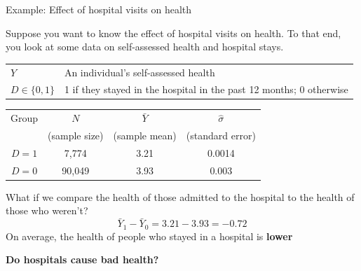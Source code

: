 \documentclass[handout, 8pt]{beamer}
\begin{document}
\begin{frame}{Example: Effect of hospital visits on health}

Suppose you want to know the effect of hospital visits on health. To that end, you look at some data on self-assessed health and hospital stays.
\pause
\begin{table}
\begin{tabular}{ll}
$Y$ & An individual's self-assessed health \\
$D \in \{0, 1\}$ & 1 if they stayed in the hospital in the past 12 months; 0 otherwise
\end{tabular}
\end{table}

\begin{table}
\begin{tabular}{cccc}
Group &$N$  &$\bar{Y}$  &$\hat{\sigma}$  \\
&(sample size) &(sample mean) &(standard error) \\
\hline
$D=1$ &7,774 &3.21 &0.0014 \\
$D=0$ &90,049 &3.93 &0.003 \\
\end{tabular}
\end{table}

\pause
\vspace{2ex}
What if we compare the health of those admitted to the hospital to the health of those who weren't?
\begin{equation*}
\bar{Y}_1 - \bar{Y}_0 = 3.21 - 3.93 = -0.72
\end{equation*}
\pause
On average, the health of people who stayed in a hospital is \textbf{lower}

\vspace{1ex}
\textbf{Do hospitals cause bad health?}
\end{frame}
\end{document}
